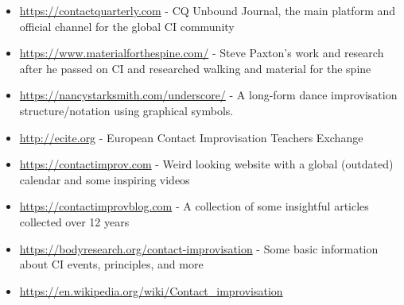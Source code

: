 \begin{itemize}
    \setlength\itemsep{0em}
    \item \url{https://contactquarterly.com} - CQ Unbound Journal, the main platform and official channel for the global CI community
    \item \url{https://www.materialforthespine.com/} - Steve Paxton's work and research after he passed on CI and researched walking and material for the spine
    \item \url{https://nancystarksmith.com/underscore/} - A long-form dance improvisation structure/notation using graphical symbols.
    \item \url{http://ecite.org} - European Contact Improvisation Teachers Exchange
    \item \url{https://contactimprov.com} - Weird looking website with a global (outdated) calendar and some inspiring videos
    \item \url{https://contactimprovblog.com} - A collection of some insightful articles collected over 12 years
    \item \url{https://bodyresearch.org/contact-improvisation} - Some basic information about CI events, principles, and more
    \item \url{https://en.wikipedia.org/wiki/Contact_improvisation}
\end{itemize}
